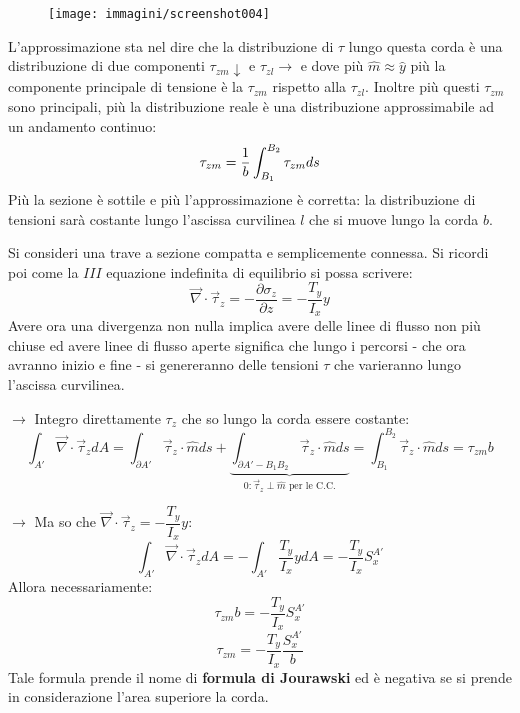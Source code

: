 \documentclass{article}
\begin{document}
\begin{adjustwidth}{2in}{}
\begin{figure}[H]
	\centering
	\texttt{[image: immagini/screenshot004]}
	\label{fig:screenshot004}
\end{figure}
		 
		 L'approssimazione sta nel dire che la distribuzione di $\tau$ lungo questa corda è una distribuzione di due componenti $\tau_{zm}\downarrow$ e $\tau_{zl}\rightarrow$ e dove più $\hat{m} \approx \hat{y}$ più la componente principale di tensione è la  $\tau_{zm}$ rispetto alla  $\tau_{zl}$. Inoltre più questi $\tau_{zm}$ sono principali, più la distribuzione reale è una distribuzione approssimabile ad un andamento continuo:
		 \[\tau_{zm} = {1\over b}\int_{B_1}^{B_2}\tau_{zm}ds\]
		 Più la sezione è sottile e più l'approssimazione è corretta: la distribuzione di tensioni sarà costante lungo l'ascissa curvilinea $l$ che si muove lungo la corda $b$. \newline 
		 
		 Si consideri una trave a sezione compatta e semplicemente connessa. Si ricordi poi come la $III$ equazione indefinita di equilibrio si possa scrivere: 
		 \[ \vec{\nabla}\cdot\vec{\tau}_z = -\dfrac{\partial \sigma_z}{\partial z} = -\dfrac{T_y}{I_x}y \]
		 Avere ora una divergenza non nulla implica avere delle linee di flusso non più chiuse ed avere linee di flusso aperte significa che lungo i percorsi - che ora avranno inizio e fine - si genereranno delle tensioni $\tau$ che varieranno lungo l'ascissa curvilinea. \newline 
		 
		 \item[$\rightarrow$] Integro direttamente $\tau_z$ che so lungo la corda essere costante:
		 \[ \int_{A'} \vec{\nabla}\cdot\vec{\tau}_z dA = \int_{\partial A'} \vec{\tau}_z \cdot \hat{m} ds + \underbrace{\int_{\partial A' -B_1B_ 2} \vec{\tau}_z \cdot \hat{m} ds}_\text{$0:\vec{\tau}_z\perp\hat{m}$ per le C.C.} = \int_{B_1}^{B_2} \vec{\tau}_z \cdot \hat{m} ds = \tau_{zm}b \]
		 \item[$\rightarrow$] Ma so che \( \vec{\nabla}\cdot\vec{\tau}_z = -\dfrac{T_y}{I_x}y\):
		 \[ \int_{A'} \vec{\nabla}\cdot\vec{\tau}_z dA = -\int_{A'}\dfrac{T_y}{I_x}ydA = -\dfrac{T_y}{I_x}S_x^{A'}\]
		 Allora necessariamente:
		 \[\tau_{zm}b = -\dfrac{T_y}{I_x}S_x^{A'} \]
		 \[ \tau_{zm} = -\dfrac{T_y}{I_x}\dfrac{S_x^{A'}}{b} \]
		 Tale formula prende il nome di \textbf{formula di Jourawski} ed è negativa se si prende in considerazione l'area superiore la corda. \newline 
		 

\end{adjustwidth}
\end{document}
